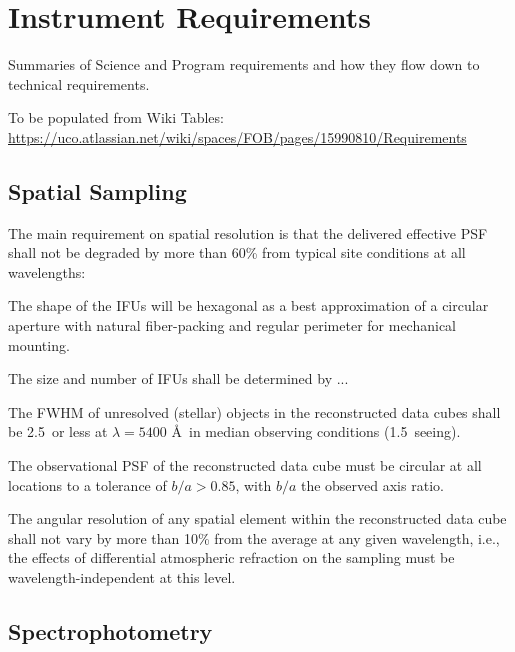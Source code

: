 \documentclass[11pt,a4paper,twoside,onecolumn,openany,final,oldfontcommands]{memoir}
\begin{document}
\chapter{Instrument Requirements}
\label{chap:instr}


Summaries of Science and Program requirements and how they flow down to technical requirements.

To be populated from Wiki Tables: \url{https://uco.atlassian.net/wiki/spaces/FOB/pages/15990810/Requirements}

\section{Spatial Sampling}
\label{sec:sampling}

\medskip
\noindent The main requirement on spatial resolution is that the delivered effective PSF shall not be degraded by more than 60\% from typical site conditions at all wavelengths:


\begin{requirement}

\reqitem The shape of the IFUs will be hexagonal as a best approximation of a circular aperture with natural fiber-packing and regular perimeter for mechanical mounting.

\reqitem The size and number of IFUs shall be determined by ...

\reqitem The FWHM of unresolved (stellar) objects in the reconstructed data cubes shall be 2.5\arcsec\ or less at $\lambda = 5400$ \AA\ in median observing conditions (1.5\arcsec\ seeing).

\reqitem The observational PSF of the reconstructed data cube must be circular at all locations to a tolerance of $b/a > 0.85$, with $b/a$ the observed axis ratio.

\reqitem The angular resolution of any spatial element within the reconstructed data cube shall not vary by more than 10\% from the average at any given wavelength, i.e., the effects of differential atmospheric refraction on the sampling must be wavelength-independent at this level.

\end{requirement}

\section{Spectrophotometry}
\label{sec:spectrophotometry}
\end{document}
